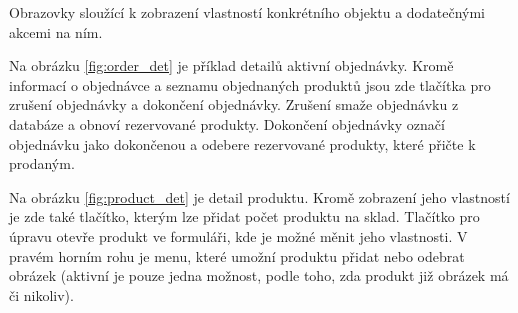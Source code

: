 \documentclass[12pt]{report}
\begin{document}
Obrazovky sloužící k zobrazení vlastností konkrétního objektu a dodatečnými akcemi na ním.

Na obrázku \ref{fig:order_det} je příklad detailů aktivní objednávky. Kromě informací o objednávce
a seznamu objednaných produktů jsou zde tlačítka pro zrušení objednávky a dokončení objednávky.
Zrušení smaže objednávku z databáze a obnoví rezervované produkty. Dokončení objednávky označí objednávku
jako dokončenou a odebere rezervované produkty, které přičte k prodaným.

Na obrázku \ref{fig:product_det} je detail produktu. Kromě zobrazení jeho vlastností je zde také tlačítko,
kterým lze přidat počet produktu na sklad. Tlačítko pro úpravu otevře produkt ve formuláři, kde je možné měnit
jeho vlastnosti. V pravém horním rohu je menu, které umožní produktu přidat nebo odebrat obrázek (aktivní je pouze
jedna možnost, podle toho, zda produkt již obrázek má či nikoliv).
%
\end{document}

